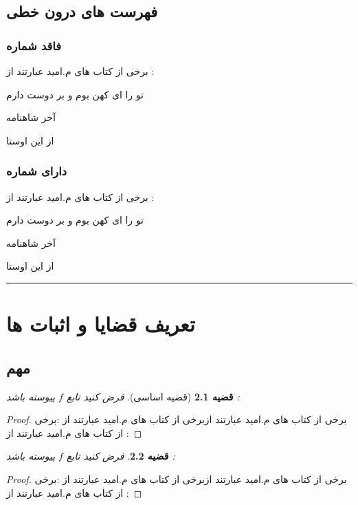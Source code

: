 \documentclass[12pt]{book}
\newtheorem{thm}{قضیه}[section] %
\begin{document}
\section{فهرست های درون خطی}

\subsection{فاقد شماره}
برخی از کتاب های م.امید عبارتند از :
\begin{inparaitem}
\item 
تو را ای کهن بوم و بر دوست دارم
\item 
آخر شاهنامه
\item 
از این اوستا

\end{inparaitem}

\subsection{دارای شماره}

برخی از کتاب های م.امید عبارتند از :
\begin{inparaenum}
	\item 
	تو را ای کهن بوم و بر دوست دارم
	\item 
	آخر شاهنامه
	\item 
	از این اوستا
\end{inparaenum}

\rule{\textwidth}{1pt}
\chapter{تعریف قضایا و اثبات ها}

\section{مهم}

\begin{thm}[قضیه اساسی]
	فرض کنید تابع $f$ پیوسته باشد :
\end{thm}
\begin{proof}
	برخی از کتاب های م.امید عبارتند ازبرخی از کتاب های م.امید عبارتند از :برخی از کتاب های م.امید عبارتند از :
\end{proof}

\begin{thm}
	فرض کنید تابع $f$ پیوسته باشد :
\end{thm}
\begin{proof}
	برخی از کتاب های م.امید عبارتند ازبرخی از کتاب های م.امید عبارتند از :برخی از کتاب های م.امید عبارتند از :
\end{proof}
\end{document}
